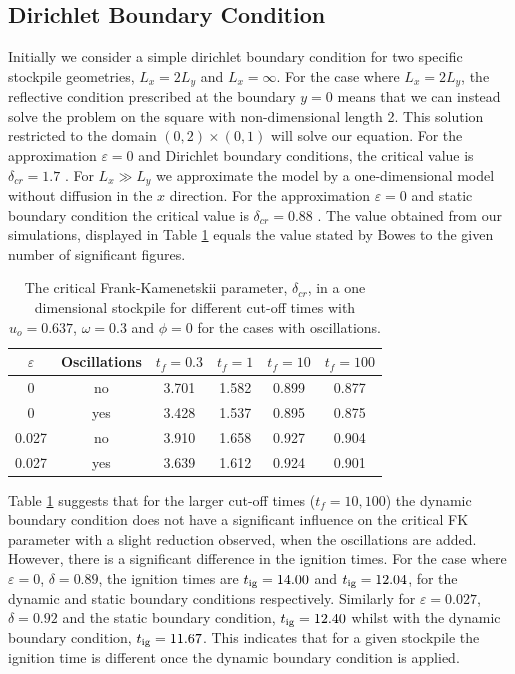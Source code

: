 \subsection{Dirichlet Boundary Condition}
Initially we consider a simple dirichlet boundary condition for two specific stockpile geometries, $L_x=2L_y$ and $L_x=\infty$. For the case where $L_x=2L_y$, the reflective condition prescribed at the boundary $y=0$ means that we can instead solve the problem on the square with non-dimensional length 2. This solution restricted to the domain $(0,2)\times (0,1)$ will solve our equation. For the approximation $\varepsilon=0$ and Dirichlet boundary conditions, the critical value is $\delta_{cr}=1.7$ \cite{bowes}. For $L_x \gg L_y$ we approximate the model by a one-dimensional model without diffusion in the $x$ direction. For the approximation $\varepsilon=0$ and static boundary condition the critical value is $\delta_{cr}=0.88$ \cite{bowes}. The value obtained from our simulations, displayed in Table \ref{1ddelt} equals the value stated by Bowes \cite{bowes} to the given number of significant figures.\\ 
\begin{table}[h!]
\caption{The critical Frank-Kamenetskii parameter, $\delta_{cr}$, in a one dimensional stockpile for different cut-off times with $u_o=0.637$, $\omega=0.3$ and $\phi=0$ for the cases with oscillations.}
\centering
\begin{tabular}{|c|c|c|c|c|c|}
\hline
$\varepsilon$ & Oscillations &$t_f=0.3$& $t_f=1$ & $t_f=10$ & $t_f=100$ \\ \hline
0 & no & 3.701 & 1.582 & 0.899 & 0.877 \\ \hline
0 & yes & 3.428 & 1.537 & 0.895 & 0.875 \\ \hline
0.027 & no & 3.910 & 1.658 & 0.927 & 0.904 \\ \hline
0.027 & yes & 3.639 & 1.612 & 0.924 & 0.901 \\ \hline
\end{tabular}
\label{1ddelt}
\end{table}
Table \ref{1ddelt} suggests that for the larger cut-off times ($t_f=10,100$) the dynamic boundary condition does not have a significant influence on the critical FK parameter with a slight reduction observed, when the oscillations are added. However, there is a significant difference in the ignition times.
For the case where $\varepsilon=0$, $\delta=0.89$, the ignition times are $t_{\text{ig}}=14.00$ and $t_{\text{ig}}=12.04$, for the dynamic and static boundary conditions respectively. Similarly for $\varepsilon=0.027$, $\delta=0.92$ and the static boundary condition, $t_{\text{ig}}=12.40$ whilst with the dynamic boundary condition, $t_{\text{ig}}=11.67$. This indicates that for a given stockpile the ignition time is different once the dynamic boundary condition is applied. \\ 
